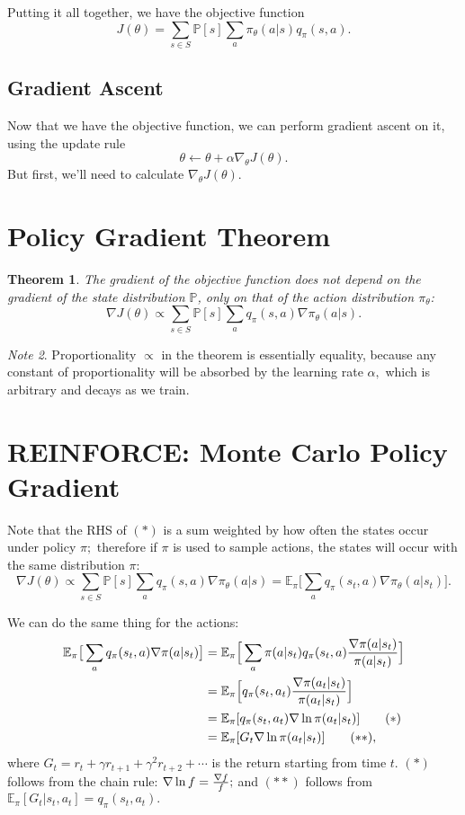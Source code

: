 \documentclass[10pt]{article}
\theoremstyle{plain}
\newtheorem{theorem}{Theorem}
\theoremstyle{definition}
\theoremstyle{remark}
\newtheorem{note}[theorem]{Note}
\renewcommand\frac[2]{\genfrac{}{}{0.5pt}{}{#1}{#2}}
\newcommand{\hE}{\mathbb E}
\newcommand{\hP}{\mathbb P}
\newcommand{\0}{\varnothing}
\newcommand{\<}{\langle}
\renewcommand{\>}{\rangle}
\begin{document}
Putting it all together, we have the objective function $$
J(\theta) = \sum_{s\in S} \hP[s] \sum_{a} \pi_\theta(a|s) q_\pi(s, a).
$$

\subsection{Gradient Ascent}

Now that we have the objective function, we can perform gradient ascent on it, using the update rule $$
  \theta \gets \theta + \alpha \nabla_\theta J(\theta).
$$
But first, we'll need to calculate $ \nabla_\theta J(\theta). $

\section{Policy Gradient Theorem}

\begin{theorem}
The gradient of the objective function does not depend on the gradient of the state distribution $ \hP $, only on that of the action distribution $ \pi_\theta $:
\[
\nabla J(\theta) \propto \sum_{s\in S} \hP[s] \sum_{a} q_\pi(s, a) \nabla \pi_\theta(a|s). \tag{$ * $}
\]
\end{theorem}

\begin{note}
  Proportionality $ \propto $ in the theorem is essentially equality, because any constant of proportionality will be absorbed by the learning rate $ \alpha, $ which is arbitrary and decays as we train.
\end{note}

\section{REINFORCE: Monte Carlo Policy Gradient}

Note that the RHS of $ (*) $ is a sum weighted by how often the states occur under policy $ \pi; $ therefore if $ \pi $ is used to sample actions, the states will occur with the same distribution $ \pi $:
$$
\nabla J(\theta) \propto \sum_{s\in S} \hP[s] \sum_{a} q_\pi(s, a) \nabla \pi_\theta(a|s) = \hE_\pi \big[ \sum_{a} q_\pi(s_t, a) \nabla \pi_\theta(a|s_t) \big].
$$

We can do the same thing for the actions: \begin{align*}
\hE_\pi \big[ \sum_{a} q_\pi(s_t, a) \nabla \pi(a|s_t) \big] &= \hE_\pi \Big[ \sum_{a} \pi(a|s_t) q_\pi(s_t, a) \frac{\nabla \pi(a|s_t)}{\pi(a|s_t)} \Big] \\
&= \hE_\pi \Big[ q_\pi(s_t, a_t) \frac{\nabla \pi(a_t|s_t)}{\pi(a_t|s_t)} \Big] \\
&= \hE_\pi [ q_\pi(s_t, a_t) \nabla \ln \pi(a_t|s_t) ] \tag{$ * $}\\
&= \hE_\pi [ G_t \nabla \ln \pi(a_t|s_t) ] \tag{$ ** $},
\end{align*}
where $ G_t = r_t + \gamma r_{t+1} + \gamma^2 r_{t+2} + \cdots $ is the return starting from time $ t. $ $ (*) $ follows from the chain rule: $ \nabla \ln f = \frac{\nabla f}{f}; $ and $ (**) $ follows from $ \hE_\pi [ G_t | s_t, a_t ] = q_\pi(s_t, a_t). $
\end{document}
